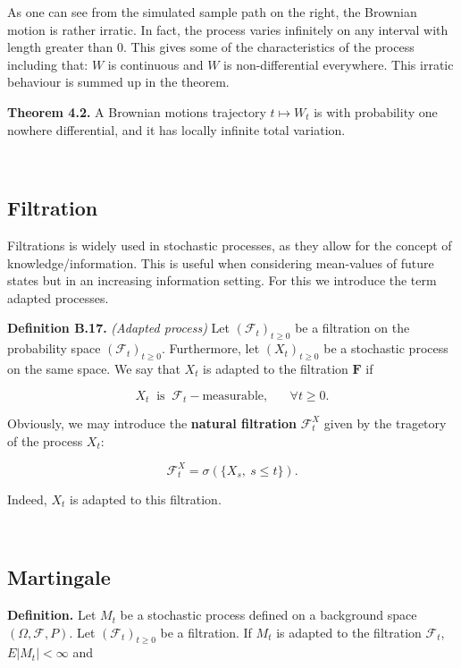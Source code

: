 \documentclass[
]{article}
\begin{document}
As one can see from the simulated sample path on the right, the Brownian
motion is rather irratic. In fact, the process varies infinitely on any
interval with length greater than 0. This gives some of the
characteristics of the process including that: \(W\) is continuous and
\(W\) is non-differential everywhere. This irratic behaviour is summed
up in the theorem.

\textbf{Theorem 4.2.} A Brownian motions trajectory \(t\mapsto W_t\) is
with probability one nowhere differential, and it has locally infinite
total variation.

~

\hypertarget{filtration}{%
\subsection{Filtration}\label{filtration}}

Filtrations is widely used in stochastic processes, as they allow for
the concept of knowledge/information. This is useful when considering
mean-values of future states but in an increasing information setting.
For this we introduce the term adapted processes.

\textbf{Definition B.17.} \emph{(Adapted process)} Let
\((\mathcal{F}_t)_{t\ge 0}\) be a filtration on the probability space
\((\mathcal{F}_t)_{t\ge 0}\). Furthermore, let \((X_t)_{t\ge 0}\) be a
stochastic process on the same space. We say that \(X_t\) is adapted to
the filtration \(\mathbf{F}\) if

\[X_t\ \text{ is }\ \mathcal{F}_t-\text{measurable},\hspace{20pt}\forall t\ge 0.\]

Obviously, we may introduce the \textbf{natural filtration}
\(\mathcal{F}^X_t\) given by the tragetory of the process \(X_t\):

\[\mathcal{F}^X_t=\sigma(\{X_s,\ s\le t\}).\]

Indeed, \(X_t\) is adapted to this filtration.

~

\hypertarget{martingale}{%
\subsection{Martingale}\label{martingale}}

\textbf{Definition.} Let \(M_t\) be a stochastic process defined on a
background space \((\Omega,\mathcal{F},P)\). Let
\((\mathcal{F}_t)_{t\ge 0}\) be a filtration. If \(M_t\) is adapted to
the filtration \(\mathcal{F}_t\), \(E\vert M_t\vert <\infty\) and
\end{document}
